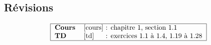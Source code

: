 \subsection{Révisions}

$$\begin{tabular}{|ll@{ : }l|}
\hline
\textbf{Cours} & \cite{cours} & chapitre 1, section 1.1 \\
\textbf{TD}    & \cite{td}    & exercices 1.1 à 1.4, 1.19 à 1.28 \\
\hline
\end{tabular}$$

